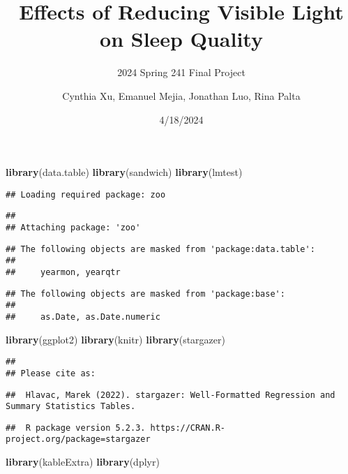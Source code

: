 \documentclass[
]{article}
\title{Effects of Reducing Visible Light on Sleep Quality}
\subtitle{2024 Spring 241 Final Project}
\author{Cynthia Xu, Emanuel Mejia, Jonathan Luo, Rina Palta}
\date{4/18/2024}
\newenvironment{Shaded}{\begin{snugshade}}{\end{snugshade}}
\newcommand{\FunctionTok}[1]{\textcolor[rgb]{0.13,0.29,0.53}{\textbf{#1}}}
\newcommand{\NormalTok}[1]{#1}
\begin{document}
\maketitle

\begin{Shaded}
\begin{Highlighting}[]
\FunctionTok{library}\NormalTok{(data.table)}
\FunctionTok{library}\NormalTok{(sandwich)}
\FunctionTok{library}\NormalTok{(lmtest)}
\end{Highlighting}
\end{Shaded}

\begin{verbatim}
## Loading required package: zoo
\end{verbatim}

\begin{verbatim}
## 
## Attaching package: 'zoo'
\end{verbatim}

\begin{verbatim}
## The following objects are masked from 'package:data.table':
## 
##     yearmon, yearqtr
\end{verbatim}

\begin{verbatim}
## The following objects are masked from 'package:base':
## 
##     as.Date, as.Date.numeric
\end{verbatim}

\begin{Shaded}
\begin{Highlighting}[]
\FunctionTok{library}\NormalTok{(ggplot2)}
\FunctionTok{library}\NormalTok{(knitr)}
\FunctionTok{library}\NormalTok{(stargazer)}
\end{Highlighting}
\end{Shaded}

\begin{verbatim}
## 
## Please cite as:
\end{verbatim}

\begin{verbatim}
##  Hlavac, Marek (2022). stargazer: Well-Formatted Regression and Summary Statistics Tables.
\end{verbatim}

\begin{verbatim}
##  R package version 5.2.3. https://CRAN.R-project.org/package=stargazer
\end{verbatim}

\begin{Shaded}
\begin{Highlighting}[]
\FunctionTok{library}\NormalTok{(kableExtra)}
\FunctionTok{library}\NormalTok{(dplyr)}
\end{Highlighting}
\end{Shaded}
\end{document}
